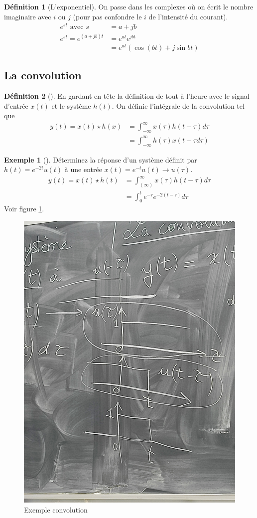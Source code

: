 \documentclass{article}
\theoremstyle{plain}%
\theoremstyle{definition}
\newtheorem{defn}{Définition}[section]
\newtheorem{exmp}{Exemple}[section]
\theoremstyle{remark}
\begin{document}
\begin{defn}[L'exponentiel]
    On passe dans les complexes où on écrit le nombre imaginaire avec $ i $ ou $ j $ (pour pas confondre le $ i $ de l'intensité du courant). \begin{align*}
        e^{st} \text{ avec } s &= a + jb \\
        e^{st} = e^{(a+jb)t} &= e^{at} e^{jbt} \\
                            &= e^{at}(\cos (bt) + j \sin bt)
    \end{align*}
\end{defn}

\subsection{La convolution}
\begin{defn}[]
    En gardant en tête la définition de tout à l'heure avec le signal d'entrée $ x(t) $ et le système $ h(t) $. On définie l'intégrale de la convolution tel que 
    \begin{align*}
        y(t) = x(t) \star h(x) &= \int_{-\infty}^{\infty } x(\tau  )h(t-\tau  ) d \tau  \\
        & = \int_{-\infty }^{\infty }h(\tau  )x(t-\tau    d \tau  )
    \end{align*}
\end{defn}
\begin{exmp}[]
    Déterminez la réponse d'un système définit par $ h(t) = e^{-2t} u(t)$  à une entrée $ x(t)=e^{-t}u(t) \to u(\tau ) $. 
    \begin{align*}
        y(t) = x(t) \star h(t) &= \int_{(\infty )}^{\infty } x(\tau )h(t-\tau )d \tau \\
        &= \int_{0}^{t}e^{-\tau }e^{-2(t-\tau )}d \tau 
    \end{align*}
    Voir figure \ref{exmp_conv_1}.
    \begin{figure}[!htbp]
        \centering
        \includegraphics[width=.60\textwidth]{./figures/fig1.jpg}
        \caption{Exemple convolution}
        \label{exmp_conv_1}
    \end{figure}
\end{exmp}
\end{document}

